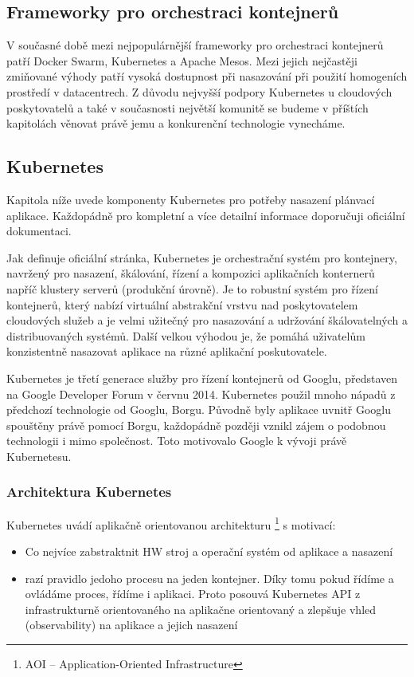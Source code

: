 \documentclass[thesis=M,czech]{FITthesis}[2019/12/23]
\theoremstyle{plain}
\theoremstyle{definition}
\begin{document}
\subsection{Frameworky pro orchestraci kontejnerů}


V současné době mezi nejpopulárnější frameworky pro orchestraci kontejnerů patří Docker Swarm, Kubernetes a Apache Mesos. Mezi jejich nejčastěji zmiňované výhody patří vysoká dostupnost při nasazování při použití homogeních prostředí v datacentrech. Z důvodu nejvyšší podpory Kubernetes u cloudových poskytovatelů a také v současnosti největší komunitě se budeme v příštích kapitolách věnovat právě jemu a konkurenční technologie vynecháme.

\subsection{Kubernetes}

Kapitola níže uvede komponenty Kubernetes pro potřeby nasazení plánvací aplikace. Každopádně pro kompletní a více detailní informace doporučuji oficiální dokumentaci. 

Jak definuje oficiální stránka, Kubernetes je orchestrační systém pro kontejnery, navržený pro nasazení, škálování, řízení a kompozici aplikačních konternerů napříč klustery serverů (produkční úrovně). Je to robustní systém pro řízení  kontejnerů, který nabízí virtuální abstrakční vrstvu nad poskytovatelem cloudových služeb a je velmi užitečný pro nasazování a udržování škálovatelných a distribuovaných systémů. Další velkou výhodou je, že pomáhá uživatelům konzistentně nasazovat aplikace na různé aplikační poskutovatele.

Kubernetes je třetí generace služby pro řízení kontejnerů od Googlu, představen na Google Developer Forum v červnu 2014. Kubernetes použil mnoho nápadů z předchozí technologie od Googlu, Borgu. Původně byly aplikace uvnitř Googlu spouštěny právě pomocí Borgu, každopádně později vznikl zájem o podobnou technologii i mimo společnost. Toto motivovalo Google k vývoji právě Kubernetesu.  

\subsubsection{Architektura Kubernetes}


Kubernetes uvádí aplikačně orientovanou architekturu \footnote{AOI -- Application-Oriented Infrastructure}\cite{as-k8s-san-kho-lin}
s motivací:


\begin{itemize}  
\item  Co nejvíce zabstraktnit HW stroj a operační systém od aplikace a nasazení 
\item  razí pravidlo jedoho procesu na jeden kontejner. Díky tomu pokud řídíme a ovládáme proces, řídíme i aplikaci. Proto posouvá Kubernetes API z infrastrukturně orientovaného na aplikačne orientovaný a zlepšuje vhled (observability) na aplikace a jejich nasazení


\end{itemize}
\end{document}
